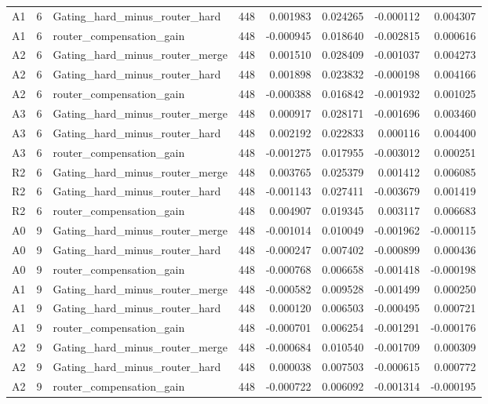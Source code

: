 \begin{tabular}{lrlrrrrr}
A1 & 6 & Gating_hard_minus_router_hard & 448 & 0.001983 & 0.024265 & -0.000112 & 0.004307 \\
A1 & 6 & router_compensation_gain & 448 & -0.000945 & 0.018640 & -0.002815 & 0.000616 \\
A2 & 6 & Gating_hard_minus_router_merge & 448 & 0.001510 & 0.028409 & -0.001037 & 0.004273 \\
A2 & 6 & Gating_hard_minus_router_hard & 448 & 0.001898 & 0.023832 & -0.000198 & 0.004166 \\
A2 & 6 & router_compensation_gain & 448 & -0.000388 & 0.016842 & -0.001932 & 0.001025 \\
A3 & 6 & Gating_hard_minus_router_merge & 448 & 0.000917 & 0.028171 & -0.001696 & 0.003460 \\
A3 & 6 & Gating_hard_minus_router_hard & 448 & 0.002192 & 0.022833 & 0.000116 & 0.004400 \\
A3 & 6 & router_compensation_gain & 448 & -0.001275 & 0.017955 & -0.003012 & 0.000251 \\
R2 & 6 & Gating_hard_minus_router_merge & 448 & 0.003765 & 0.025379 & 0.001412 & 0.006085 \\
R2 & 6 & Gating_hard_minus_router_hard & 448 & -0.001143 & 0.027411 & -0.003679 & 0.001419 \\
R2 & 6 & router_compensation_gain & 448 & 0.004907 & 0.019345 & 0.003117 & 0.006683 \\
A0 & 9 & Gating_hard_minus_router_merge & 448 & -0.001014 & 0.010049 & -0.001962 & -0.000115 \\
A0 & 9 & Gating_hard_minus_router_hard & 448 & -0.000247 & 0.007402 & -0.000899 & 0.000436 \\
A0 & 9 & router_compensation_gain & 448 & -0.000768 & 0.006658 & -0.001418 & -0.000198 \\
A1 & 9 & Gating_hard_minus_router_merge & 448 & -0.000582 & 0.009528 & -0.001499 & 0.000250 \\
A1 & 9 & Gating_hard_minus_router_hard & 448 & 0.000120 & 0.006503 & -0.000495 & 0.000721 \\
A1 & 9 & router_compensation_gain & 448 & -0.000701 & 0.006254 & -0.001291 & -0.000176 \\
A2 & 9 & Gating_hard_minus_router_merge & 448 & -0.000684 & 0.010540 & -0.001709 & 0.000309 \\
A2 & 9 & Gating_hard_minus_router_hard & 448 & 0.000038 & 0.007503 & -0.000615 & 0.000772 \\
A2 & 9 & router_compensation_gain & 448 & -0.000722 & 0.006092 & -0.001314 & -0.000195 \\

\end{tabular}
